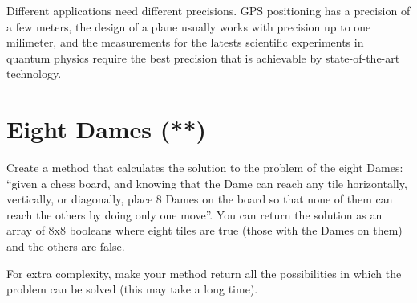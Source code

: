 \documentclass{article}
\begin{document}
Different applications need different precisions. GPS positioning has
a precision of a few meters, the design of a
plane usually works with precision up to one milimeter,
and the measurements for the latests scientific experiments in
quantum physics require the best precision that is achievable by
state-of-the-art technology. 


\section{Eight Dames (**)}
\label{sec:eight-dames}

Create a method that calculates the solution to the problem of the
eight Dames: ``given a chess board, and knowing that the Dame can reach
any tile horizontally, vertically, or diagonally, place 8 Dames on the
board so that none of them can reach the others by doing only one
move''. You can return the solution as an array of 8x8 booleans where
eight tiles are true (those with the Dames on them) and the others are false. 

For extra complexity, make your method return all the possibilities in
which the problem can be solved (this may take a long time). 



%
%
\end{document}
